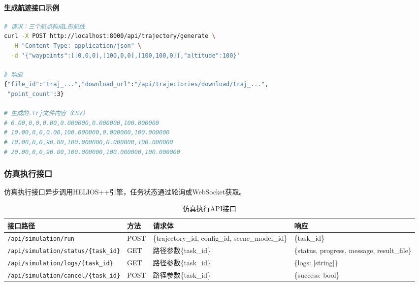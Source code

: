 \documentclass[a4paper,fleqn]{cas-sc}
\begin{document}
\paragraph{生成航迹接口示例}
\begin{lstlisting}[language=bash,caption=生成航迹]
# 请求：三个航点构成L形航线
curl -X POST http://localhost:8000/api/trajectory/generate \
  -H "Content-Type: application/json" \
  -d '{"waypoints":[[0,0,0],[100,0,0],[100,100,0]],"altitude":100}'

# 响应
{"file_id":"traj_...","download_url":"/api/trajectories/download/traj_...",
 "point_count":3}

# 生成的.trj文件内容（CSV）
# 0.00,0,0,0.00,0.000000,0.000000,100.000000
# 10.00,0,0,0.00,100.000000,0.000000,100.000000
# 10.00,0,0,90.00,100.000000,0.000000,100.000000
# 20.00,0,0,90.00,100.000000,100.000000,100.000000
\end{lstlisting}

\subsubsection{仿真执行接口}
仿真执行接口异步调用HELIOS++引擎，任务状态通过轮询或WebSocket获取。

\begin{table}[pos=!htbp]
    \centering
    \caption{仿真执行API接口}
    \label{tab:api-simulation}
    \begin{tabular}{@{} llll @{}}
        \toprule
        \textbf{接口路径}                                & \textbf{方法} & \textbf{请求体}                                     & \textbf{响应}                                 \\
        \midrule
        \texttt{/api/simulation/run}                 & POST        & \{trajectory\_id, config\_id, scene\_model\_id\} & \{task\_id\}                                \\
        \texttt{/api/simulation/status/\{task\_id\}} & GET         & 路径参数\{task\_id\}                                 & \{status, progress, message, result\_file\} \\
        \texttt{/api/simulation/logs/\{task\_id\}}   & GET         & 路径参数\{task\_id\}                                 & \{logs: [string]\}                          \\
        \texttt{/api/simulation/cancel/\{task\_id\}} & POST        & 路径参数\{task\_id\}                                 & \{success: bool\}                           \\
        \bottomrule
    \end{tabular}
\end{table}
\end{document}
